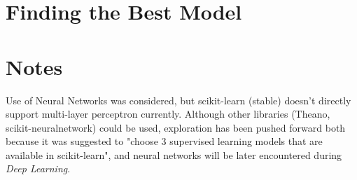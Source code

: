 \documentclass{article}
\begin{document}
	\section{Finding the Best Model}
	
	\section{Notes}
	Use of Neural Networks was considered, but scikit-learn (stable) doesn't directly support multi-layer perceptron currently. Although other libraries (Theano, scikit-neuralnetwork) could be used, exploration has been pushed forward both because it was suggested to "choose 3 supervised learning models that are available in scikit-learn", and neural networks will be later encountered during \emph{Deep Learning}.
\end{document}
